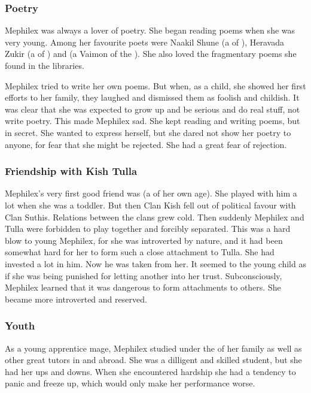 \subsubsection{Poetry}
Mephilex was always a lover of poetry.
She began reading poems when she was very young. 
Among her favourite poets were Naakil Shune (a \dax of \Ortaica), Heravada Zukir (a \sphyle of \Ortaica) and  (a Vaimon of the \caliphate). 
She also loved the fragmentary \ophidian poems she found in the \rethyax libraries. 

Mephilex tried to write her own poems. 
But when, as a child, she showed her first efforts to her family, they laughed and dismissed them as foolish and childish. 
It was clear that she was expected to grow up and be serious and do real stuff, not write poetry.
This made Mephilex sad.
She kept reading and writing poems, but in secret. 
She wanted to express herself, but she dared not show her poetry to anyone, for fear that she might be rejected.
She had a great fear of rejection. 





\subsubsection{Friendship with Kish Tulla}
Mephilex's very first good friend was  (a \dax of her own age). 
She played with him a lot when she was a toddler. 
But then Clan Kish fell out of political favour with Clan Suthis.
Relations between the clans grew cold. 
Then suddenly Mephilex and Tulla were forbidden to play together and forcibly separated. 
This was a hard blow to young Mephilex, for she was introverted by nature, and it had been somewhat hard for her to form such a close attachment to Tulla.
She had invested a lot in him. 
Now he was taken from her.
It seemed to the young child as if she was being punished for letting another into her trust. 
Subconsciously, Mephilex learned that it was dangerous to form attachments to others. 
She became more introverted and reserved. 





\subsubsection{Youth}
As a young apprentice mage, Mephilex studied under the \rethyaxes of her family as well as other great tutors in \Yormis and abroad.
She was a dilligent and skilled student, but she had her ups and downs.
When she encountered hardship she had a tendency to panic and freeze up, which would only make her performance worse. 

